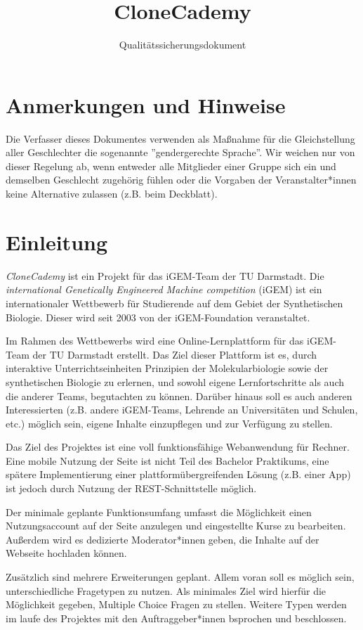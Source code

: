 \documentclass[accentcolor=tud0b,12pt,paper=a4]{tudreport}
\title{CloneCademy}
\subtitle{Qualitätssicherungsdokument}
\begin{document}
\maketitle
\tableofcontents

\chapter*{Anmerkungen und Hinweise}
Die Verfasser dieses Dokumentes verwenden als Maßnahme für die Gleichstellung aller Geschlechter die sogenannte ''gendergerechte Sprache''. Wir weichen nur von dieser Regelung ab, wenn entweder alle Mitglieder einer Gruppe sich ein und demselben Geschlecht zugehörig fühlen oder die Vorgaben der Veranstalter*innen keine Alternative zulassen (z.B. beim Deckblatt).

\chapter{Einleitung}

\emph{CloneCademy} ist ein Projekt für das iGEM-Team der TU Darmstadt. Die \emph{international Genetically Engineered Machine competition} (iGEM) ist ein internationaler Wettbewerb für Studierende auf dem Gebiet der Synthetischen Biologie.
Dieser wird seit 2003 von der iGEM-Foundation veranstaltet.

Im Rahmen des Wettbewerbs wird eine Online-Lernplattform für das iGEM-Team der TU Darmstadt erstellt. Das Ziel dieser Plattform ist es, durch interaktive Unterrichtseinheiten Prinzipien der Molekularbiologie sowie der synthetischen Biologie zu erlernen, und sowohl eigene Lernfortschritte als auch die anderer Teams, begutachten zu können. Darüber hinaus soll es auch anderen Interessierten (z.B. andere iGEM-Teams, Lehrende an Universitäten und Schulen, etc.) möglich sein, eigene Inhalte einzupflegen und zur Verfügung zu stellen.

Das Ziel des Projektes ist eine voll funktionsfähige Webanwendung für Rechner. Eine mobile Nutzung der Seite ist nicht Teil des Bachelor Praktikums, eine spätere Implementierung einer plattformübergreifenden Lösung (z.B. einer App) ist jedoch durch Nutzung der REST-Schnittstelle möglich.

Der minimale geplante Funktionsumfang umfasst die Möglichkeit einen Nutzungsaccount auf der Seite anzulegen und eingestellte Kurse zu bearbeiten. Außerdem wird es dedizierte Moderator*innen geben, die Inhalte auf der Webseite hochladen können.

Zusätzlich sind mehrere Erweiterungen geplant. Allem voran soll es möglich sein, unterschiedliche Fragetypen zu nutzen. Als minimales Ziel wird hierfür die Möglichkeit gegeben, Multiple Choice Fragen zu stellen. Weitere Typen werden im laufe des Projektes mit den Auftraggeber*innen bsprochen und beschlossen.
\end{document}
